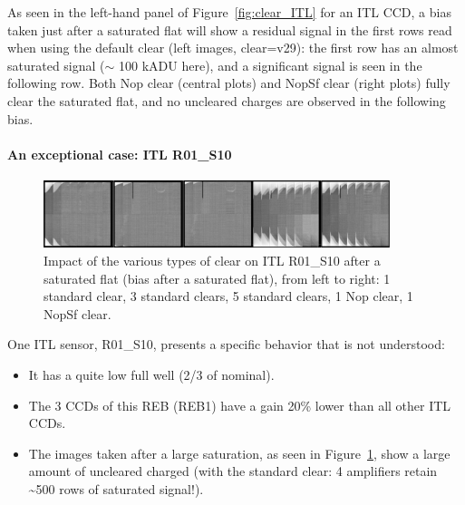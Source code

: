 As seen in the left-hand panel of Figure~\ref{fig:clear_ITL}
for an ITL CCD, a bias taken just after a saturated flat will show a
residual signal in the first rows read when using the default clear
(left images, clear=v29): the first row has an almost saturated signal
($\sim$ 100 kADU here), and a significant signal is seen in
the following row. Both Nop clear (central plots) and NopSf clear
(right plots) fully clear the saturated flat, and no uncleared charges
are observed in the following bias.

\paragraph{An exceptional case: ITL R01\_S10}\label{results-on-itl-r01s10}

\begin{figure}
\begin{centering}
\includegraphics[width=0.9\textwidth]{figures/Clear_R01_S10.png}
\end{centering}
\caption{Impact of the various types of clear on ITL
R01\_S10 after a saturated flat (bias after a saturated flat), from left
to right: 1 standard clear, 3 standard clears, 5 standard clears, 1 Nop
clear, 1 NopSf clear.}
\label{fig:clears_R01_S10}
\end{figure}


One ITL sensor, R01\_S10,
presents a specific behavior that is not understood:

\begin{itemize}
\tightlist
\item
  It has a quite low full well (2/3 of nominal).
\item
  The 3 CCDs of this REB (REB1) have a gain 20\% lower than all other ITL CCDs.
\item
  The images taken after a large saturation, as seen in Figure~\ref{fig:clears_R01_S10},
  show a large amount of uncleared charged (with the standard clear: 4
  amplifiers retain \textasciitilde500 rows of saturated signal!).
\end{itemize}

